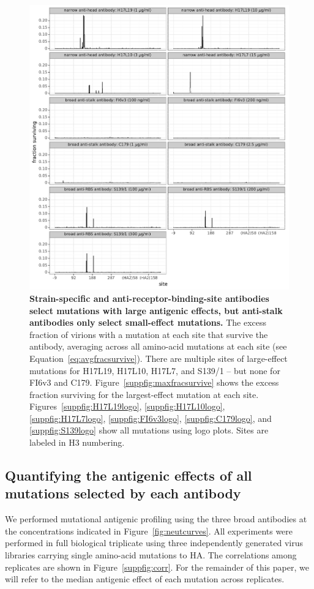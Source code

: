 \documentclass[11pt]{article}
\begin{document}
\begin{figure}
\centerline{\includegraphics[width=\textwidth]{figs/avgfracsurvive.pdf}}
\caption{
\label{fig:avgfracsurvive}
{\bf Strain-specific and anti-receptor-binding-site antibodies select mutations with large antigenic effects, but anti-stalk antibodies only select small-effect mutations.}
The excess fraction of virions with a mutation at each site that survive the antibody, averaging across all amino-acid mutations at each site (see Equation~\ref{eq:avgfracsurvive}).
There are multiple sites of large-effect mutations for H17L19, H17L10, H17L7, and S139/1 -- but none for FI6v3 and C179.
Figure~\ref{suppfig:maxfracsurvive} shows the excess fraction surviving for the largest-effect mutation at each site.
Figures~\ref{suppfig:H17L19logo}, \ref{suppfig:H17L10logo}, \ref{suppfig:H17L7logo}, \ref{suppfig:FI6v3logo}, \ref{suppfig:C179logo}, and \ref{suppfig:S139logo} show all mutations using logo plots.
Sites are labeled in H3 numbering.
}
\end{figure}

\subsection*{Quantifying the antigenic effects of all mutations selected by each antibody}
We performed mutational antigenic profiling using the three broad antibodies at the concentrations indicated in Figure~\ref{fig:neutcurves}. 
All experiments were performed in full biological triplicate using three independently generated virus libraries carrying single amino-acid mutations to HA\cite{doud2016accurate}.
The correlations among replicates are shown in Figure~\ref{suppfig:corr}.
For the remainder of this paper, we will refer to the median antigenic effect of each mutation across replicates.
\end{document}

